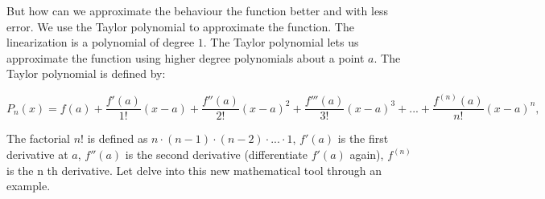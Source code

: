 \documentclass[main.tex]{subfiles}
\begin{document}
But how can we approximate the behaviour the function better and with less error. We use the Taylor polynomial to approximate the function. The linearization is a polynomial of degree $1$. The Taylor polynomial lets us approximate the function using higher degree polynomials about a point $a$. The Taylor polynomial is defined by:

\begin{equation}
P_n(x) = f(a) + \frac{f'(a)}{1!}(x-a) + \frac{f''(a)}{2!}(x-a)^2 + \frac{f'''(a)}{3!}(x-a)^3 + ... + \frac{f^{(n)}(a)}{n!}(x-a)^n,
\end{equation}      

The factorial $n!$ is defined as $n \cdot (n-1) \cdot (n-2) \cdot ... \cdot 1$, $f'(a)$ is the first derivative at $a$, $f''(a)$ is the second derivative (differentiate $f'(a)$ again), $f^{(n)}$ is the n th derivative. Let delve into this new mathematical tool through an example.
\end{document}
